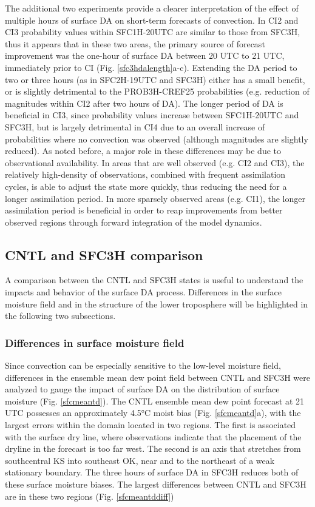 The additional two experiments provide a clearer interpretation of the effect of multiple hours of surface DA on short-term forecasts of convection. In CI2 and CI3 probability values within SFC1H-20UTC are similar to those from SFC3H, thus it appears that in these two areas, the primary source of forecast improvement was the one-hour of surface DA between 20 UTC to 21 UTC, immediately prior to CI (Fig. \ref{sfc3hdalength}a-c). Extending the DA period to two or three hours (as in SFC2H-19UTC and SFC3H) either has a small benefit, or is slightly detrimental to the PROB3H-CREF25 probabilities (e.g. reduction of magnitudes within CI2 after two hours of DA). The longer period of DA is beneficial in CI3, since probability values increase between SFC1H-20UTC and SFC3H, but is largely detrimental in CI4 due to an overall increase of probabilities where no convection was observed (although magnitudes are slightly reduced). As noted before, a major role in these differences may be due to observational availability. In areas that are well observed (e.g. CI2 and CI3), the relatively high-density of observations, combined with frequent assimilation cycles, is able to adjust the state more quickly, thus reducing the need for a longer assimilation period. In more sparsely observed areas (e.g. CI1), the longer assimilation period is beneficial in order to reap improvements from better observed regions through forward integration of the model dynamics.

\subsection{CNTL and SFC3H comparison}
A comparison between the CNTL and SFC3H states is useful to understand the impacts and behavior of the surface DA process. Differences in the surface moisture field and in the structure of the lower troposphere will be highlighted in the following two subsections.

\subsubsection{Differences in surface moisture field}
\label{tdsection}
Since convection can be especially sensitive to the low-level moisture field, differences in the ensemble mean dew point field between CNTL and SFC3H were analyzed to gauge the impact of surface DA on the distribution of surface moisture (Fig. \ref{sfcmeantd}). The CNTL ensemble mean dew point forecast at 21 UTC possesses an approximately 4.5°C moist bias (Fig. \ref{sfcmeantd}a), with the largest errors within the domain located in two regions. The first is associated with the surface dry line, where observations indicate that the placement of the dryline in the forecast is too far west. The second is an axis that stretches from southcentral KS into southeast OK, near and to the northeast of a weak stationary boundary. The three hours of surface DA in SFC3H reduces both of these surface moisture biases. The largest differences between CNTL and SFC3H are in these two regions (Fig. \ref{sfcmeantddiff})

